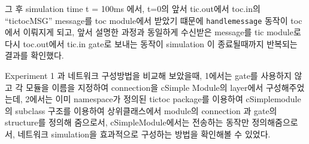             그 후 simulation time t = 100ms 에서, t=0의 앞서 tic.out에서 toc.in의 “tictocMSG” message를 toc module에서 받았기 떄문에 \texttt{handlemessage} 동작이 toc 에서 이뤄지게 되고, 앞서 설명한 과정과 동일하게 수신받은 message를 tic module로 다시 toc.out에서 tic.in gate로 보내는 동작이 simulation 이 종료될때까지 반복되는 결과를 확인했다.
            
            Experiment 1 과 네트워크 구성방법을 비교해 보았을때, 1에서는 gate를 사용하지 않고 각 모듈을 이름을 지정하여 connection을 cSimple Module의 layer에서 구성해주었는데, 2에서는 이미 namespace가 정의된 tictoc package를 이용하여 cSimplemodule의 subclass 구조를 이용하여 상위클래스에서 module의 connection 과 gate의 structure를 정의해 줌으로서, cSimpleModule에서는 전송하는 동작만 정의해줌으로서, 네트워크 simulation을 효과적으로 구성하는 방법을 확인해볼 수 있었다.
\clearpage